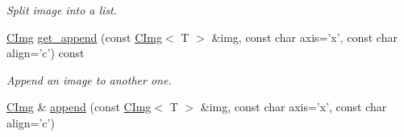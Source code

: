 \begin{DoxyCompactItemize}
\begin{DoxyCompactList}\small\item\em Split image into a list. \end{DoxyCompactList}\item 
\hypertarget{structcimg__library_1_1_c_img_a17c3656abd8d7e1be4932ee1cddc4692}{\hyperlink{structcimg__library_1_1_c_img}{C\-Img} \hyperlink{structcimg__library_1_1_c_img_a17c3656abd8d7e1be4932ee1cddc4692}{get\-\_\-append} (const \hyperlink{structcimg__library_1_1_c_img}{C\-Img}$<$ T $>$ \&img, const char axis='x', const char align='c') const }\label{structcimg__library_1_1_c_img_a17c3656abd8d7e1be4932ee1cddc4692}

\begin{DoxyCompactList}\small\item\em Append an image to another one. \end{DoxyCompactList}\item 
\hypertarget{structcimg__library_1_1_c_img_a8442c06fc68070a08e4a83c55813dc57}{\hyperlink{structcimg__library_1_1_c_img}{C\-Img} \& \hyperlink{structcimg__library_1_1_c_img_a8442c06fc68070a08e4a83c55813dc57}{append} (const \hyperlink{structcimg__library_1_1_c_img}{C\-Img}$<$ T $>$ \&img, const char axis='x', const char align='c')}\label{structcimg__library_1_1_c_img_a8442c06fc68070a08e4a83c55813dc57}


\end{DoxyCompactItemize}
